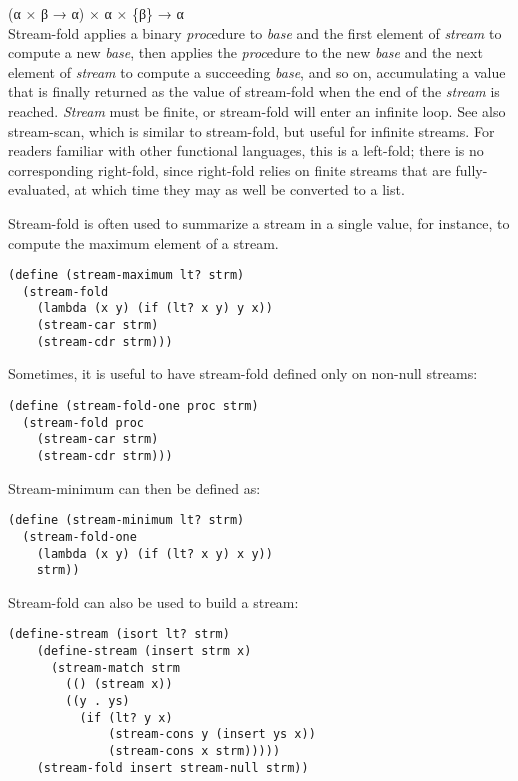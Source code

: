 \begin{entry}{%
  }

  (α × β → α) × α × \{β\} → α\\
  Stream-fold applies a binary \emph{proc}edure to \emph{base} and the
  first element of \emph{stream} to compute a new \emph{base}, then
  applies the \emph{proc}edure to the new \emph{base} and the next
  element of \emph{stream} to compute a succeeding \emph{base}, and so
  on, accumulating a value that is finally returned as the value of
  stream-fold when the end of the \emph{stream} is
  reached. \emph{Stream} must be finite, or stream-fold will enter an
  infinite loop. See also stream-scan, which is similar to
  stream-fold, but useful for infinite streams. For readers familiar
  with other functional languages, this is a left-fold; there is no
  corresponding right-fold, since right-fold relies on finite streams
  that are fully-evaluated, at which time they may as well be
  converted to a list.

  Stream-fold is often used to summarize a stream in a single value,
  for instance, to compute the maximum element of a stream.

\begin{verbatim}
(define (stream-maximum lt? strm)
  (stream-fold
    (lambda (x y) (if (lt? x y) y x))
    (stream-car strm)
    (stream-cdr strm)))
\end{verbatim}

  Sometimes, it is useful to have stream-fold defined only on non-null
  streams:

\begin{verbatim}
(define (stream-fold-one proc strm)
  (stream-fold proc
    (stream-car strm)
    (stream-cdr strm)))
\end{verbatim}

  Stream-minimum can then be defined as:

\begin{verbatim}
(define (stream-minimum lt? strm)
  (stream-fold-one
    (lambda (x y) (if (lt? x y) x y))
    strm))
\end{verbatim}

  Stream-fold can also be used to build a stream:

\begin{verbatim}
(define-stream (isort lt? strm)
    (define-stream (insert strm x)
      (stream-match strm
        (() (stream x))
        ((y . ys)
          (if (lt? y x)
              (stream-cons y (insert ys x))
              (stream-cons x strm)))))
    (stream-fold insert stream-null strm))
\end{verbatim}
\end{entry}

